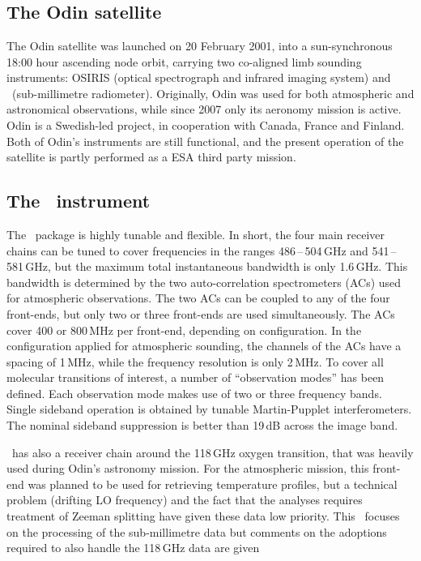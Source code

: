 \section{\smr}
\label{sec:smr}
%
\subsection{The Odin satellite}
\label{sec:odin}
%
The Odin satellite was launched on 20 February 2001, into a sun-synchronous
18:00 hour ascending node orbit, carrying two co-aligned limb sounding
instruments: OSIRIS (optical spectrograph and infrared imaging system) and
\SMR\ (sub-millimetre radiometer). Originally, Odin was used for both
atmospheric and astronomical observations, while since 2007 only its aeronomy
mission is active. Odin is a Swedish-led project, in cooperation with Canada,
France and Finland. Both of Odin's instruments are still functional, and the
present operation of the satellite is partly performed as a ESA third party
mission.


\subsection{The \SMR\ instrument}
\label{sec:smr:details}
%
The \smr\ package is highly tunable and flexible. In short, the four main
receiver chains can be tuned to cover frequencies in the ranges
486\,--\,504\,GHz and 541\,--\,581\,GHz, but the maximum total instantaneous
bandwidth is only 1.6\,GHz. This bandwidth is determined by the two
auto-correlation spectrometers (ACs) used for atmospheric observations. The two
ACs can be coupled to any of the four front-ends, but only two or three
front-ends are used simultaneously. The ACs cover 400 or 800\,MHz per
front-end, depending on configuration. In the configuration applied for
atmospheric sounding, the channels of the ACs have a spacing of 1\,MHz, while
the frequency resolution is only 2\,MHz. To
cover all molecular transitions of interest, a number of ``observation modes''
has been defined. Each observation mode makes use of two or three frequency
bands. Single sideband operation is obtained by tunable Martin-Pupplet
interferometers. The nominal sideband suppression is better than 19\,dB across
the image band.

\smr\ has also a receiver chain around the 118\,GHz oxygen transition, that was
heavily used during Odin's astronomy mission. For the atmospheric mission, this
front-end was planned to be used for retrieving temperature profiles, but a
technical problem (drifting LO frequency) and the fact that the analyses
requires treatment of Zeeman splitting have given these data low priority. This
\ATBD\ focuses on the processing of the sub-millimetre data but comments on the
adoptions required to also handle the 118\,GHz data are given

